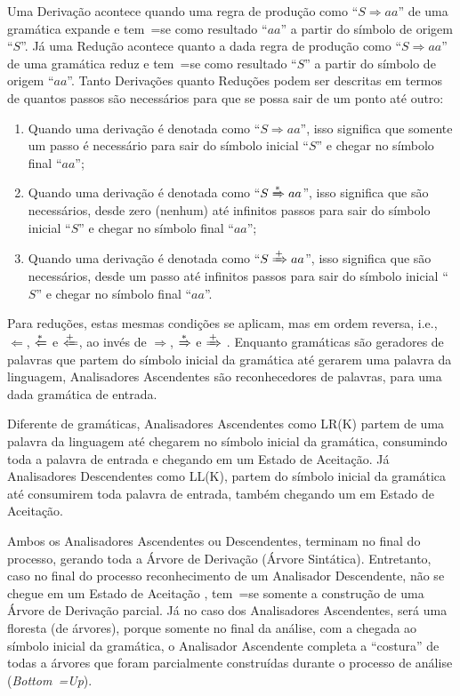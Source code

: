 Uma Derivação acontece quando uma regra de produção como ``$S \Rightarrow a a $'' de uma gramática expande e
tem~=se como resultado ``$a a$'' a partir do símbolo de origem ``$S$''.
Já uma Redução acontece quanto a dada regra de produção como ``$S \Rightarrow a a $'' de uma gramática reduz e
tem~=se como resultado ``$S$'' a partir do símbolo de origem ``$a a$''.
Tanto Derivações quanto Reduções podem ser descritas em termos de quantos passos são necessários para que se possa sair de um ponto até outro:
\begin{enumerate}%
    \item Quando uma derivação é denotada como ``$S \Rightarrow a a $'',
    isso significa que somente um passo é necessário para sair do símbolo inicial ``$S$'' e
    chegar no símbolo final ``$a a$'';
    \item Quando uma derivação é denotada como ``$S \xRightarrow{*} a a $'',
    isso significa que são necessários,
    desde zero (nenhum) até infinitos passos para sair do símbolo inicial ``$S$'' e
    chegar no símbolo final ``$a a$'';
    \item Quando uma derivação é denotada como ``$S \xRightarrow{+} a a $'',
    isso significa que são necessários,
    desde um passo até infinitos passos para sair do símbolo inicial ``$S$'' e
    chegar no símbolo final ``$a a$''.
\end{enumerate}

Para reduções,
estas mesmas condições se aplicam,
mas em ordem reversa,
i.e., $\Leftarrow$, $\xLeftarrow{*}$ e $\xLeftarrow{+}$,
ao invés de $\Rightarrow$,
$\xRightarrow{*}$ e
$\xRightarrow{+}$ \cite{ahoCompilerDragonBook}.
Enquanto gramáticas são geradores de palavras que partem do símbolo inicial da gramática até gerarem uma palavra da linguagem,
Analisadores Ascendentes são reconhecedores de palavras,
para uma dada gramática de entrada.

Diferente de gramáticas,
Analisadores Ascendentes como LR(K) partem de uma palavra da linguagem até chegarem no símbolo inicial da gramática,
consumindo toda a palavra de entrada e
chegando em um Estado de Aceitação.
Já Analisadores Descendentes como LL(K),
partem do símbolo inicial da gramática até consumirem toda palavra de entrada,
também chegando um em Estado de Aceitação.

Ambos os Analisadores Ascendentes ou
Descendentes,
terminam no final do processo,
gerando toda a Árvore de Derivação (Árvore Sintática).
Entretanto,
caso no final do processo reconhecimento de um Analisador Descendente,
não se chegue em um Estado de Aceitação \cite{ahoCompilerDragonBook},
tem~=se somente a construção de uma Árvore de Derivação parcial.
Já no caso dos Analisadores Ascendentes,
será uma floresta (de árvores),
porque somente no final da análise,
com a chegada ao símbolo inicial da gramática,
o Analisador Ascendente completa a ``costura'' de todas a árvores que foram parcialmente construídas durante o processo de análise (\textit{Bottom~=Up}).

